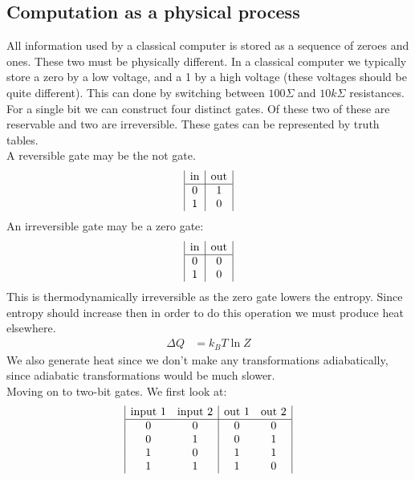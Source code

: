 \subsection{Computation as a physical process}
All information used by a classical computer is stored as a sequence of zeroes and ones. These two must be physically different. In a classical computer we typically store a zero by a low voltage, and a 1 by a high voltage (these voltages should be quite different). This can done by switching between $100 \Sigma$ and $10k\Sigma$ resistances. \\
For a single bit we can construct four distinct gates. Of these two of these are reservable and two are irreversible. These gates can be represented by truth tables.\\
A reversible gate may be the not gate.
\begin{displaymath}
\begin{array}{| c | c |}
	\text{in} & \text{out} \\
	\hline
	0 & 1 \\
	1 & 0
\end{array}
\end{displaymath}
An irreversible gate may be a zero gate:
\begin{displaymath}
\begin{array}{| c | c |}
	\text{in} & \text{out} \\
	\hline
	0 & 0 \\
	1 & 0
\end{array}
\end{displaymath}
This is thermodynamically irreversible as the zero gate lowers the entropy. Since entropy should increase then in order to do this operation we must produce heat elsewhere.
\begin{align*}
	\Delta Q &= k_B T\ln Z
\end{align*}
We also generate heat since we don't make any transformations adiabatically, since adiabatic transformations would be much slower. \\
Moving on to two-bit gates. We first look at:
\begin{displaymath}
\begin{array}{| c c | c c |}
	\text{input 1} & \text{input 2} & \text{out 1} & \text{out 2} \\
	\hline
	0 & 0 & 0 & 0\\
	0 & 1 & 0 & 1\\
	1 & 0 & 1 & 1\\
	1 & 1 & 1 & 0
\end{array}
\end{displaymath}

